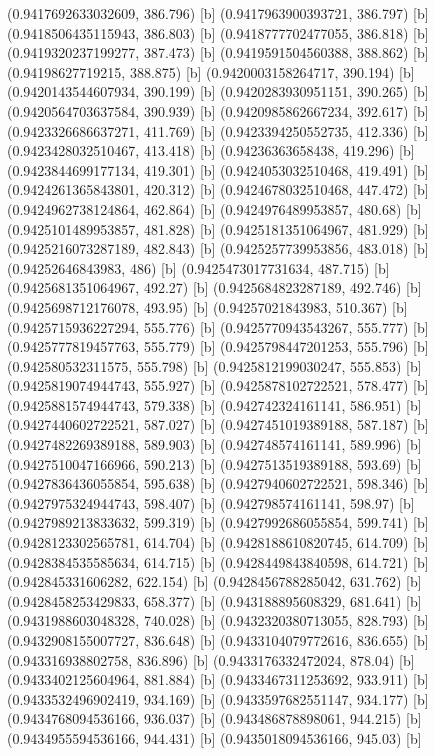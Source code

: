 {{{(0.9417692633032609, 386.796) [b] 
(0.9417963900393721, 386.797) [b] 
(0.9418506435115943, 386.803) [b] 
(0.9418777702477055, 386.818) [b] 
(0.9419320237199277, 387.473) [b] 
(0.9419591504560388, 388.862) [b] 
(0.94198627719215, 388.875) [b] 
(0.9420003158264717, 390.194) [b] 
(0.9420143544607934, 390.199) [b] 
(0.9420283930951151, 390.265) [b] 
(0.9420564703637584, 390.939) [b] 
(0.9420985862667234, 392.617) [b] 
(0.9423326686637271, 411.769) [b] 
(0.9423394250552735, 412.336) [b] 
(0.9423428032510467, 413.418) [b] 
(0.94236363658438, 419.296) [b] 
(0.9423844699177134, 419.301) [b] 
(0.9424053032510468, 419.491) [b] 
(0.9424261365843801, 420.312) [b] 
(0.9424678032510468, 447.472) [b] 
(0.9424962738124864, 462.864) [b] 
(0.9424976489953857, 480.68) [b] 
(0.9425101489953857, 481.828) [b] 
(0.9425181351064967, 481.929) [b] 
(0.9425216073287189, 482.843) [b] 
(0.9425257739953856, 483.018) [b] 
(0.94252646843983, 486) [b] 
(0.9425473017731634, 487.715) [b] 
(0.9425681351064967, 492.27) [b] 
(0.9425684823287189, 492.746) [b] 
(0.9425698712176078, 493.95) [b] 
(0.94257021843983, 510.367) [b] 
(0.9425715936227294, 555.776) [b] 
(0.9425770943543267, 555.777) [b] 
(0.9425777819457763, 555.779) [b] 
(0.9425798447201253, 555.796) [b] 
(0.942580532311575, 555.798) [b] 
(0.9425812199030247, 555.853) [b] 
(0.9425819074944743, 555.927) [b] 
(0.9425878102722521, 578.477) [b] 
(0.9425881574944743, 579.338) [b] 
(0.942742324161141, 586.951) [b] 
(0.9427440602722521, 587.027) [b] 
(0.9427451019389188, 587.187) [b] 
(0.9427482269389188, 589.903) [b] 
(0.942748574161141, 589.996) [b] 
(0.9427510047166966, 590.213) [b] 
(0.9427513519389188, 593.69) [b] 
(0.9427836436055854, 595.638) [b] 
(0.9427940602722521, 598.346) [b] 
(0.9427975324944743, 598.407) [b] 
(0.942798574161141, 598.97) [b] 
(0.9427989213833632, 599.319) [b] 
(0.9427992686055854, 599.741) [b] 
(0.9428123302565781, 614.704) [b] 
(0.9428188610820745, 614.709) [b] 
(0.9428384535585634, 614.715) [b] 
(0.9428449843840598, 614.721) [b] 
(0.942845331606282, 622.154) [b] 
(0.9428456788285042, 631.762) [b] 
(0.9428458253429833, 658.377) [b] 
(0.943188895608329, 681.641) [b] 
(0.9431988603048328, 740.028) [b] 
(0.9432320380713055, 828.793) [b] 
(0.9432908155007727, 836.648) [b] 
(0.9433104079772616, 836.655) [b] 
(0.943316938802758, 836.896) [b] 
(0.9433176332472024, 878.04) [b] 
(0.9433402125604964, 881.884) [b] 
(0.9433467311253692, 933.911) [b] 
(0.9433532496902419, 934.169) [b] 
(0.9433597682551147, 934.177) [b] 
(0.9434768094536166, 936.037) [b] 
(0.943486878898061, 944.215) [b] 
(0.9434955594536166, 944.431) [b] 
(0.9435018094536166, 945.03) [b] 
}}}

